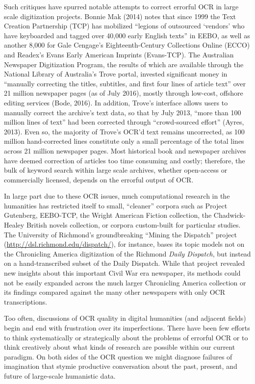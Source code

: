 \documentclass[twoside,11pt]{report}
\begin{document}
Such critiques have spurred notable attempts to correct errorful OCR in large scale digitization projects. Bonnie Mak (2014) notes that since 1999 the Text Creation Partnership (TCP) has mobilized ``legions of outsourced `vendors' who have keyboarded and tagged over 40,000 early English texts'' in EEBO, as well as another 8,000 for Gale Cengage's Eighteenth-Century Collections Online (ECCO) and Readex's Evans Early American Imprints (Evans-TCP). The Australian Newspaper Digitization Program, the results of which are available through the National Library of Australia's Trove portal, invested significant money in ``manually correcting the titles, subtitles, and first four lines of article text'' over 21 million newspaper pages (as of July 2016), mostly through low-cost, offshore editing services (Bode, 2016). In addition, Trove's interface allows users to manually correct the archive's text data, so that by July 2013, ``more than 100 million lines of text'' had been corrected through ``crowd-sourced effort'' (Ayres, 2013). Even so, the majority of Trove's OCR'd text remains uncorrected, as 100 million hand-corrected lines constitute only a small percentage of the total lines across 21 million newspaper pages. Most historical book and newspaper archives have deemed correction of articles too time consuming and costly; therefore, the bulk of keyword search within large scale archives, whether open-access or commercially licensed, depends on the errorful output of OCR.

In large part due to these OCR issues, much computational research in the humanities has restricted itself to small, ``cleaner'' corpora such as Project Gutenberg, EEBO-TCP, the Wright American Fiction collection, the Chadwick-Healey British novels collection, or corpora custom-built for particular studies. The University of Richmond's groundbreaking ``Mining the Dispatch'' project (\url{http://dsl.richmond.edu/dispatch/}), for instance, bases its topic models not on the Chronicling America digitization of the Richmond \emph{Daily Dispatch}, but instead on a hand-transcribed subset of the Daily Dispatch. While that project revealed new insights about this important Civil War era newspaper, its methods could not be easily expanded across the much larger Chronicling America collection or its findings compared against the many other newspapers with only OCR transcriptions.

Too often, discussions of OCR quality in digital humanities (and adjacent fields) begin and end with frustration over its imperfections. There have been few efforts to think systematically or strategically about the problems of errorful OCR or to think creatively about what kinds of research are possible within our current paradigm. On both sides of the OCR question we might diagnose failures of imagination that stymie productive conversation about the past, present, and future of large-scale humanistic data.
\end{document}
